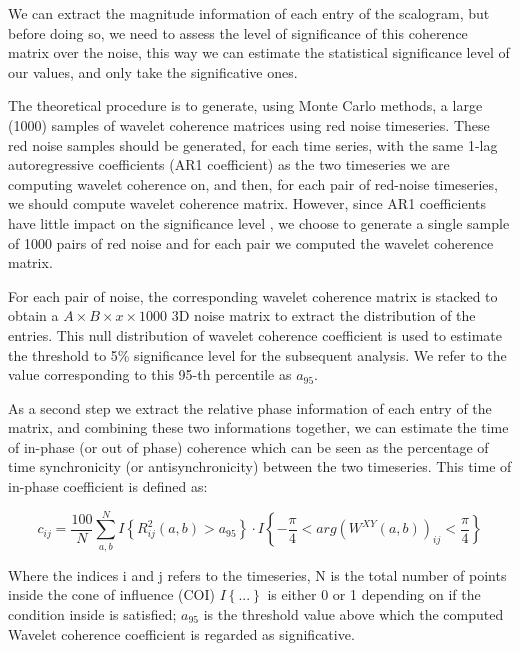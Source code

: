 \documentclass[10pt]{report}
\begin{document}
We can extract the magnitude information of each entry of the scalogram, but before doing so, we need to assess the level of significance of this coherence matrix over the noise, this way we can estimate the statistical significance level of our values, and only take the significative ones.

The theoretical procedure \cite{grinsted-2004} \cite{bernas-2018} is to generate, using Monte Carlo methods, a large (1000) samples of wavelet coherence matrices using red noise timeseries. \cite{hartmann-2014}
These red noise samples should be generated, for each time series, with the same 1-lag autoregressive coefficients (AR1 coefficient) as the two timeseries we are computing wavelet coherence on, and then, for each pair of red-noise timeseries, we should compute wavelet coherence matrix.
However, since AR1 coefficients have little impact on the significance level \cite{grinsted-2004}, we choose to generate a single sample of 1000 pairs of red noise and for each pair we computed the wavelet coherence matrix.

For each pair of noise, the corresponding wavelet coherence matrix is stacked to obtain a $A\times B \times x \times 1000$ 3D noise matrix to extract the distribution of the entries.
This null distribution of wavelet coherence coefficient is used to estimate the threshold to 5\% significance level for the subsequent analysis.
We refer to the value corresponding to this 95-th percentile as $a_{95}$.


As a second step we extract the relative phase information of each entry of the matrix, and combining these two informations together, we can estimate the time of in-phase (or out of phase) coherence which can be seen as the percentage of time synchronicity (or antisynchronicity) between the two timeseries. \cite{bernas-2018}
This time of in-phase coefficient is defined as:

\begin{equation} \label{eq:wcohcoefficients}
c_{ij} = \frac{100}{N}\sum_{a, b}^N I\left\{ R_{ij}^2(a,b) > a_{95}\right\}\cdot I\left\{-\frac{\pi}{4}<arg(W^{XY}(a, b))_{ij} < \frac{\pi}{4}  \right\}
\end{equation}

Where the indices i and j refers to the timeseries, N is the total number of points inside the cone of influence (COI) $I\left\{ ...\right\}$ is either 0 or 1 depending on if the condition inside is satisfied; $a_{95}$ is the threshold value above which the computed Wavelet coherence coefficient is regarded as significative.
\end{document}
